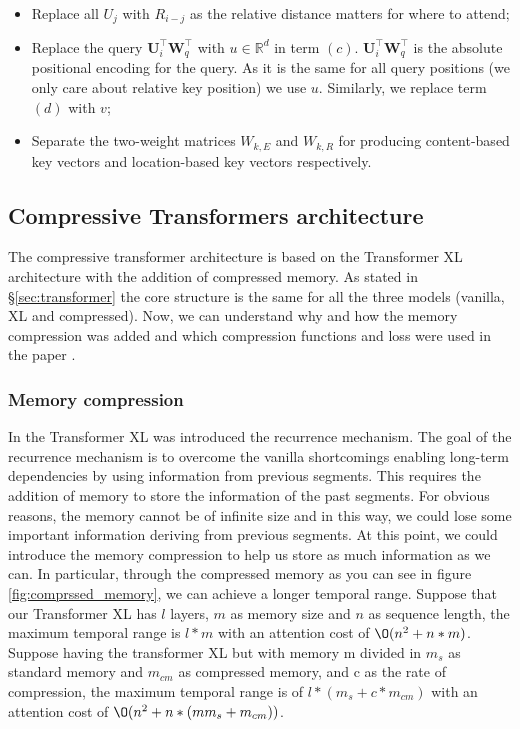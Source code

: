 \begin{itemize}
\begin{align}
	\end{align}
	\begin{itemize}
		\item Replace all $U_{j}$ with $R_{i-j}$ as the relative distance matters for where to attend;
		\item Replace the query $\mathbf{U}_{i}^{\top} \mathbf{W}_{q}^{\top}$ with $u \in \mathbb{R}^{d}$ in term $(c)$.
		$\mathbf{U}_{i}^{\top} \mathbf{W}_{q}^{\top}$ is the absolute positional encoding for the query. As it is the same for all query positions (we only care about relative key position) we use $u$. Similarly, we replace term $(d)$ with $v$;
		\item Separate the two-weight matrices $W_{k, E}$ and $W_{k, R}$ for producing content-based key vectors and location-based key vectors respectively.
	\end{itemize}
	
	
	
\end{itemize}

\subsection{Compressive Transformers architecture}

The compressive transformer architecture is based on the Transformer XL architecture \cite{tranformerxl} with the addition of compressed memory. As stated in \S\ref{sec:transformer} the core structure is the same for all the three models (vanilla, XL and compressed). Now, we can understand why and how the memory compression was added and which compression functions and loss were used in the paper \cite{raecompressive2019}.

\subsubsection{Memory compression}
\label{sec:memory_compression}
In the Transformer XL \cite{tranformerxl} was introduced the recurrence mechanism. The goal of the recurrence mechanism is to overcome the vanilla shortcomings enabling long-term dependencies by using information from previous segments. This requires the addition of memory to store the information of the past segments. For obvious reasons, the memory cannot be of infinite size and in this way, we could lose some important information deriving from previous segments. At this point, we could introduce the memory compression to help us store as much information as we can. In particular, through the compressed memory as you can see in figure \ref{fig:comprssed_memory}, we can achieve a longer temporal range. Suppose that our Transformer XL has $l$ layers, $m$ as memory size and $n$ as sequence length, the maximum temporal range is $l*m$ with an attention cost of $\O(n^2 + n*m)$. Suppose having the transformer XL but with memory m divided in $m_{s}$ as standard memory and $m_{cm}$ as compressed memory, and c as the rate of compression, the maximum temporal range is of $l*(m_{s} + c*m_{cm})$ with an attention cost of $\O(n^2 + n*(mm_{s} + m_{cm}))$. 


